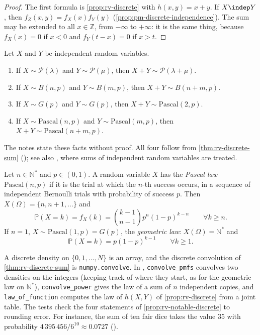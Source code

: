 \begin{proof}
The first formula is \cref{prop:rv-discrete} with $h(x,y)=x+y$. If $X\indep Y$, then
$f_Z(x,y)=f_X(x)f_Y(y)$ (\cref{prop:pm-discrete-independence}). The sum may be extended to all
$x\in\mathbb Z$, from $-\infty$ to $+\infty$: it is the same thing, because $f_X(x)=0$ if $x<0$ and
$f_Y(t-x)=0$ if $x>t$.
\end{proof}

\begin{proposition}\label{prop:rv-notable-discrete}
Let $X$ and $Y$ be independent random variables.
\begin{enumerate}[label=\arabic*)]
  \item If $X\sim\mathcal P(\lambda)$ and $Y\sim\mathcal P(\mu)$, then $X+Y\sim\mathcal P(\lambda+\mu)$.
  \item If $X\sim B(n,p)$ and $Y\sim B(m,p)$, then $X+Y\sim B(n+m,p)$.
  \item If $X\sim G(p)$ and $Y\sim G(p)$, then $X+Y\sim\mathrm{Pascal}(2,p)$.
  \item If $X\sim\mathrm{Pascal}(n,p)$ and $Y\sim\mathrm{Pascal}(m,p)$, then
    $X+Y\sim\mathrm{Pascal}(n+m,p)$.
\end{enumerate}
\end{proposition}

The notes state these facts without proof. All four follow from \cref{thm:rv-discrete-sum}
(); see also \citet[Chapter~6]{ross-5}, where sums of independent random
variables are treated.

\begin{remark}\label{rem:rv-pascal}
Let $n\in\mathbb N^*$ and $p\in(0,1)$. A random variable $X$ has the \emph{Pascal law}
$\mathrm{Pascal}(n,p)$ if it is the trial at which the $n$-th success occurs, in a sequence of
independent Bernoulli trials with probability of success $p$. Then $X(\Omega)=\{n,n+1,\dots\}$ and
\[
  \mathbb P(X=k)=f_X(k)=\binom{k-1}{n-1}p^n(1-p)^{k-n}\qquad\forall k\ge n .
\]
If $n=1$, $X\sim\mathrm{Pascal}(1,p)=G(p)$, the \emph{geometric law}: $X(\Omega)=\mathbb N^*$ and
\[
  \mathbb P(X=k)=p(1-p)^{k-1}\qquad\forall k\ge1 .
\]
\end{remark}

\begin{remark}[computational]\label{rem:rv-code-discrete}
A discrete density on $\{0,1,\dots,N\}$ is an array, and the discrete convolution of
\cref{thm:rv-discrete-sum} is \texttt{numpy.convolve}. In ,
\texttt{convolve\_pmfs} convolves two densities on the integers (keeping track of where they start,
as for the geometric law on $\mathbb N^*$), \texttt{convolve\_power} gives the law of a sum of $n$
independent copies, and \texttt{law\_of\_function} computes the law of $h(X,Y)$ of
\cref{prop:rv-discrete} from a joint table. The tests check the four statements of
\cref{prop:rv-notable-discrete} to rounding error. For instance, the sum of ten fair dice takes the
value $35$ with probability $4\,395\,456/6^{10}\approx0.0727$ ().
\end{remark}

